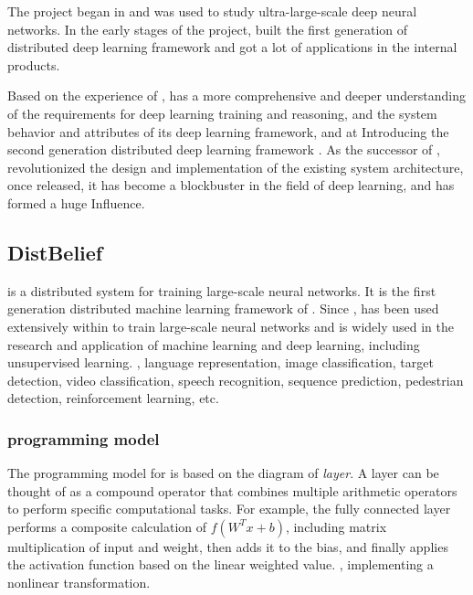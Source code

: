 \begin{content}

The  project began in  and was used to study ultra-large-scale deep neural networks. In the early stages of the project,  built the first generation of distributed deep learning framework  and got a lot of applications in the  internal products.

Based on the experience of ,  has a more comprehensive and deeper understanding of the requirements for deep learning training and reasoning, and the system behavior and attributes of its deep learning framework, and at  Introducing the second generation distributed deep learning framework \tf{}. \tf{} As the successor of , revolutionized the design and implementation of the existing system architecture, \tf{} once released, it has become a blockbuster in the field of deep learning, and has formed a huge Influence.

\subsection{DistBelief}

 is a distributed system for training large-scale neural networks. It is the first generation distributed machine learning framework of . Since ,  has been used extensively within  to train large-scale neural networks and is widely used in the research and application of machine learning and deep learning, including unsupervised learning. , language representation, image classification, target detection, video classification, speech recognition, sequence prediction, pedestrian detection, reinforcement learning, etc.

\subsubsection{programming model}

The programming model for  is based on the  diagram of \emph{layer}. A layer can be thought of as a compound operator that combines multiple arithmetic operators to perform specific computational tasks. For example, the fully connected layer performs a composite calculation of $f({W^T}x + b)$, including matrix multiplication of input and weight, then adds it to the bias, and finally applies the activation function based on the linear weighted value. , implementing a nonlinear transformation.


\end{content}
